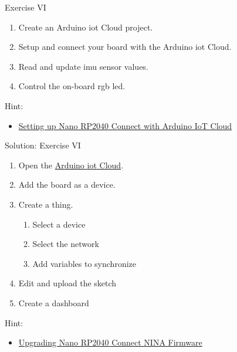 \begin{frame}
    \begin{exampleblock}{Exercise VI}
        \begin{enumerate}
            \item Create an Arduino\textregistered{} \acs{iot} Cloud project.
            \item Setup and connect your board with the Arduino \acs{iot} Cloud.
            \item Read and update \acs{imu} sensor values.
            \item Control the on-board \acs{rgb} \acs{led}.
        \end{enumerate}
        \par Hint:
        \begin{itemize}
            \item \href{https://docs.arduino.cc/tutorials/nano-rp2040-connect/rp2040-iot-cloud}{Setting up Nano RP2040 Connect with Arduino\textregistered{} IoT Cloud}
        \end{itemize}
    \end{exampleblock}
\end{frame}

\begin{frame}{Solution: Exercise VI}
    \begin{exampleblock}{}
        \begin{enumerate}
            \item Open the \href{https://create.arduino.cc/iot/}{Arduino\textregistered{} \acs{iot} Cloud}.
            \item Add the board as a device.
            \item Create a thing.
                  \begin{enumerate}
                      \item Select a device
                      \item Select the network
                      \item Add variables to synchronize
                  \end{enumerate}
            \item Edit and upload the sketch
            \item Create a dashboard
        \end{enumerate}
        \par Hint:
        \begin{itemize}
            \item \href{https://docs.arduino.cc/tutorials/nano-rp2040-connect/rp2040-upgrading-nina-firmware}{Upgrading Nano RP2040 Connect NINA Firmware}
        \end{itemize}
    \end{exampleblock}
\end{frame}

